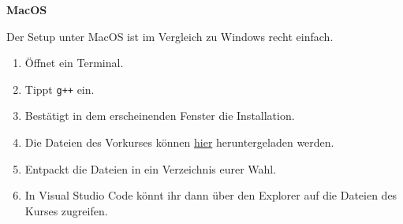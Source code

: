 \textbf{MacOS}

\pagestyle{empty}

Der Setup unter MacOS ist im Vergleich zu Windows recht einfach.

\begin{enumerate}
	\item Öffnet ein Terminal.
	\item Tippt \texttt{g++} ein.
	\item Bestätigt in dem erscheinenden Fenster die Installation.
	\item Die Dateien des Vorkurses können \href{https://mathphys.info/vorkurs/pvk/vorkurs.zip}{hier} heruntergeladen werden.
	\item Entpackt die Dateien in ein Verzeichnis eurer Wahl.
	\item In Visual Studio Code könnt ihr dann über den Explorer auf die Dateien des Kurses zugreifen.
\end{enumerate}
